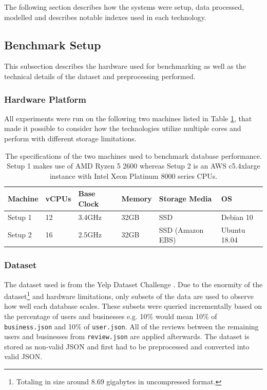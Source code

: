 The following section describes how the systems were setup, data processed, modelled and describes notable indexes used in each technology.

\subsection{Benchmark Setup}

This subsection describes the hardware used for benchmarking as well as the technical details of the dataset and preprocessing performed.

\subsubsection{Hardware Platform}
All experiments were run on the following two machines listed in Table \ref{tab:hardware}, that made it possible to consider how the technologies utilize multiple cores and perform with different storage limitations.

\begin{table}[h]
    \centering
    \small
    \caption{The specifications of the two machines used to benchmark database performance. Setup 1 makes use of AMD Ryzen 5 2600 whereas Setup 2 is an AWS c5.4xlarge instance with Intel Xeon Platinum 8000 series CPUs.}
    \vspace*{5mm}
    \begin{tabular}{ |p{1.2cm}|p{1.2cm}|p{2cm}|p{1.6cm}|p{2.7cm}|p{2cm}|}
        \hline
        \rowcolor{Gray}
        Machine   & vCPUs & Base Clock & Memory & Storage Media & OS           \\
        \hline
        Setup 1   & 12    & 3.4GHz     & 32GB   & SSD               & Debian 10    \\
        Setup 2   & 16    & 2.5GHz     & 32GB   & SSD (Amazon EBS)  & Ubuntu 18.04 \\
        \hline
    \end{tabular}
    \label{tab:hardware}
\end{table}

\subsubsection{Dataset}
The dataset used is from the Yelp Dataset Challenge \cite{yelpdataset}. Due to the enormity of the dataset\footnote{Totaling in size around 8.69 gigabytes in uncompressed format.} and hardware limitations, only subsets of the data are used to observe how well each database scales. These subsets were queried incrementally based on the percentage of users and businesses e.g. 10\% would mean 10\% of \texttt{business.json} and 10\% of \texttt{user.json}. All of the reviews between the remaining users and businesses from \texttt{review.json} are applied afterwards. The dataset is stored as non-valid JSON and first had to be preprocessed and converted into valid JSON.

